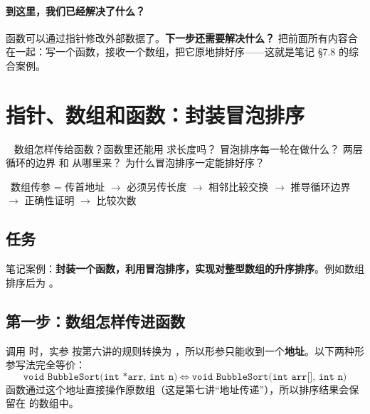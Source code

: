 \paragraph{到这里，我们已经解决了什么？} 函数可以通过指针修改外部数据了。\textbf{下一步还需要解决什么？} 把前面所有内容合在一起：写一个函数，接收一个数组，把它原地排好序——这就是笔记 §7.8 的综合案例。

\section{指针、数组和函数：封装冒泡排序}\label{sec:bubble}
\  数组怎样传给函数？函数里还能用  求长度吗？ 冒泡排序每一轮在做什么？ 两层循环的边界  和  从哪里来？ 为什么冒泡排序一定能排好序？\par
{}\ 数组传参 = 传首地址 $\to$ 必须另传长度 $\to$ 相邻比较交换 $\to$ 推导循环边界 $\to$ 正确性证明 $\to$ 比较次数

\subsection{任务}
笔记案例：\textbf{封装一个函数，利用冒泡排序，实现对整型数组的升序排序}。例如数组  排序后为 。

\subsection{第一步：数组怎样传进函数}
\begin{definitionbox}[数组作函数参数]
调用  时，实参  按第六讲的规则转换为 ，所以形参只能收到一个\textbf{地址}。以下两种形参写法完全等价：
\[
\texttt{void BubbleSort(int *arr, int n)}\ \Longleftrightarrow\ \texttt{void BubbleSort(int arr[], int n)}
\]
函数通过这个地址直接操作原数组（这是第七讲“地址传递”），所以排序结果会保留在  的数组中。
\end{definitionbox}

